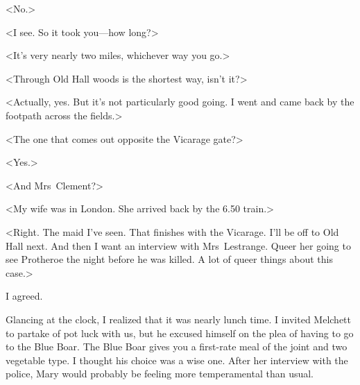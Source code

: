 <No.>

<I see. So it took you—how long?>

<It's very nearly two miles, whichever way you go.>

<Through Old Hall woods is the shortest way, isn't it?>

<Actually, yes. But it's not particularly good going. I went and came back by the footpath across the fields.>

<The one that comes out opposite the Vicarage gate?>

<Yes.>

<And Mrs~Clement?>

<My wife was in London. She arrived back by the 6.50 train.>

<Right. The maid I've seen. That finishes with the Vicarage. I'll be off to Old Hall next. And then I want an interview with Mrs~Lestrange. Queer her going to see Protheroe the night before he was killed. A lot of queer things about this case.>

I agreed.

Glancing at the clock, I realized that it was nearly lunch time. I invited Melchett to partake of pot luck with us, but he excused himself on the plea of having to go to the Blue Boar. The Blue Boar gives you a first-rate meal of the joint and two vegetable type. I thought his choice was a wise one. After her interview with the police, Mary would probably be feeling more temperamental than usual.